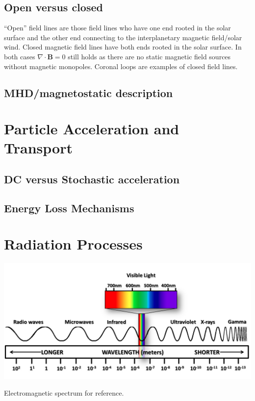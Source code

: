 	\subsection{Open versus closed}
	``Open'' field lines are those field lines who have one end rooted in the solar surface and the other end connecting to the interplanetary magnetic field/solar wind. Closed magnetic field lines have both ends rooted in the solar surface. In both cases $\nabla\cdot\mathbf{B}=0$ still holds as there are no static magnetic field sources without magnetic monopoles. Coronal loops are examples of closed field lines.  
	
	\subsection{MHD/magnetostatic description}

\section{Particle Acceleration and Transport}
	\subsection{DC versus Stochastic acceleration}
	\subsection{Energy Loss Mechanisms}

\section{Radiation Processes}
\begin{marginfigure}
	\centering
	\includegraphics[width=\columnwidth]{figures/em_spectrum.png}
	\caption{Electromagnetic spectrum for reference.}
\end{marginfigure}

